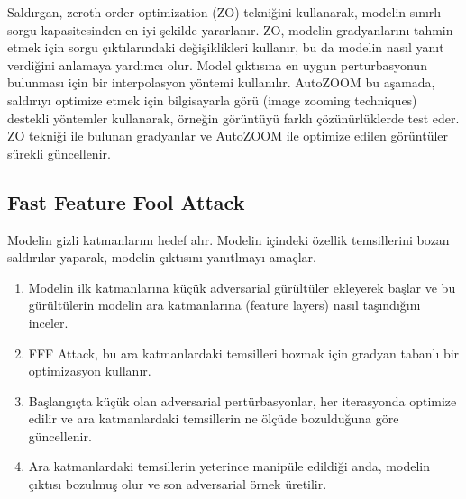 Saldırgan, zeroth-order optimization (ZO) tekniğini kullanarak, modelin sınırlı sorgu kapasitesinden en iyi şekilde yararlanır. ZO, modelin gradyanlarını tahmin etmek için sorgu çıktılarındaki değişiklikleri kullanır, bu da modelin nasıl yanıt verdiğini anlamaya yardımcı olur. Model çıktısına en uygun perturbasyonun bulunması için bir interpolasyon yöntemi kullanılır. AutoZOOM bu aşamada, saldırıyı optimize etmek için bilgisayarla görü (image zooming techniques) destekli yöntemler kullanarak, örneğin görüntüyü farklı çözünürlüklerde test eder. ZO tekniği ile bulunan gradyanlar ve AutoZOOM ile optimize edilen görüntüler sürekli güncellenir.

\newpage

\subsection{Fast Feature Fool Attack}

Modelin gizli katmanlarını hedef alır. Modelin içindeki özellik temsillerini bozan saldırılar yaparak, modelin çıktısını yanıtlmayı amaçlar.

\begin{enumerate}
    \item Modelin ilk katmanlarına küçük adversarial gürültüler ekleyerek başlar ve bu gürültülerin modelin ara katmanlarına (feature layers) nasıl taşındığını inceler.
    \item FFF Attack, bu ara katmanlardaki temsilleri bozmak için gradyan tabanlı bir optimizasyon kullanır. 
    \item Başlangıçta küçük olan adversarial pertürbasyonlar, her iterasyonda optimize edilir ve ara katmanlardaki temsillerin ne ölçüde bozulduğuna göre güncellenir.
    \item Ara katmanlardaki temsillerin yeterince manipüle edildiği anda, modelin çıktısı bozulmuş olur ve son adversarial örnek üretilir.
\end{enumerate}

\newpage